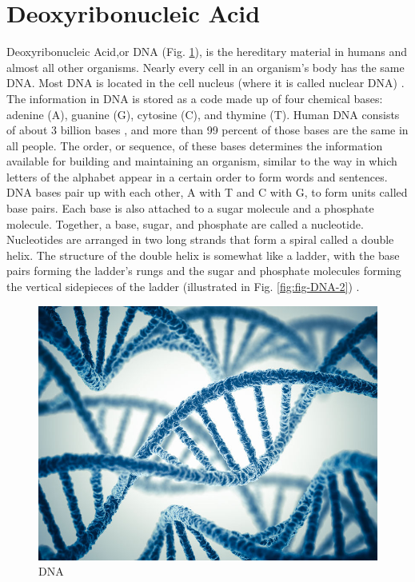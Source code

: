 \documentclass[12pt,openany]{llncs}
\begin{document}
\section{Deoxyribonucleic Acid}
Deoxyribonucleic Acid,or DNA  (Fig. \ref{fig:fig-DNA-1}), is the hereditary material in humans and almost all other organisms. Nearly every cell in an organism’s body has the same DNA. Most DNA is located in the cell nucleus (where it is called nuclear DNA) \cite{DNA1,DNA2}.
The information in DNA is stored as a code made up of four chemical bases: adenine (A), guanine (G), cytosine (C), and thymine (T). Human DNA consists of about 3 billion bases \cite{DNA4}, and more than 99 percent of those bases are the same in all people. The order, or sequence, of these bases determines the information available for building and maintaining an organism, similar to the way in which letters of the alphabet appear in a certain order to form words and sentences.
DNA bases pair up with each other, A with T and C with G, to form units called base pairs. Each base is also attached to a sugar molecule and a phosphate molecule. Together, a base, sugar, and phosphate are called a nucleotide. Nucleotides are arranged in two long strands that form a spiral called a double helix. The structure of the double helix is somewhat like a ladder, with the base pairs forming the ladder’s rungs and the sugar and phosphate molecules forming the vertical sidepieces of the ladder (illustrated in Fig. \ref{fig:fig-DNA-2}) \cite{DNA5}.
\newpage
\begin{figure}
	\centering
	\includegraphics{./figs/DNA-1}
    \caption{\label{fig:fig-DNA-1}DNA}
\end{figure}
\end{document}
